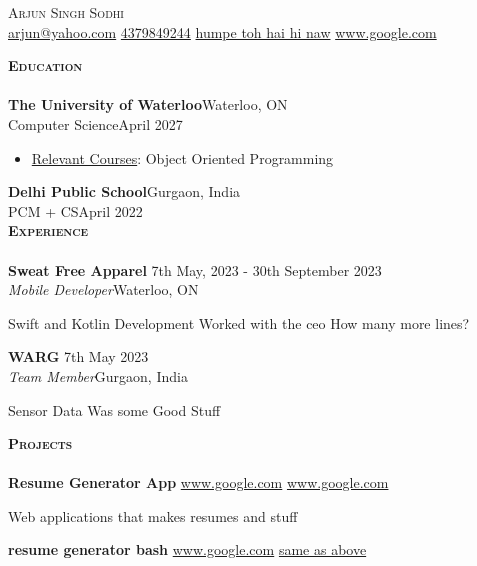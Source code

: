 \documentclass[a4paper]{article}
\newcommand{\lineunder} {
    \vspace*{-8pt} \\
    \hspace*{-18pt} \hrulefill \\
}
\newcommand{\header} [1] {
    {\hspace*{-18pt}\vspace*{6pt} \textsc{#1}}
    \vspace*{-6pt} \lineunder
}
\begin{document}
\vspace*{-40pt} 

\vspace*{-10pt}
        \begin{center}
        {\Huge \scshape Arjun Singh Sodhi} \vspace{2pt} \\
        \href{mailto:arjun@yahoo.com}{arjun@yahoo.com}
        \vline \hspace{.5pt} \href{tel:4379849244}{4379849244} 
 \vline \hspace{.5pt} \href{humpe toh hai hi naw}{humpe toh hai hi naw} 
 \vline \hspace{.5pt} \href{www.google.com}{www.google.com} 
\end{center} 
\header{\textbf{Education}} 
\textbf{The University of Waterloo}\hfill Waterloo, ON\\ 
Computer Science\hfill April 2027\\ 
\begin{itemize} \itemsep 0pt 
 \item{\underline{Relevant Courses}: Object Oriented Programming} 
 \end{itemize} 
\textbf{Delhi Public School}\hfill Gurgaon, India\\ 
PCM + CS\hfill April 2022\\ 
\header{\textbf{Experience}} 
\textbf{Sweat Free Apparel} \hfill 7th May, 2023 - 30th September 2023\\ 
\textit{Mobile Developer}\hfill Waterloo, ON\\ 
\begin{itemize} \itemsep 0pt 
\textbullet Swift and Kotlin Development 
\textbullet Worked with the ceo 
\textbullet How many more lines? 
\end{itemize} 
\textbf{WARG} \hfill 7th May 2023\\ 
\textit{Team Member}\hfill Gurgaon, India\\ 
\begin{itemize} \itemsep 0pt 
\textbullet Sensor Data 
\textbullet Was some Good Stuff 
\end{itemize} 
\header{\textbf{Projects}} 
\textbf{Resume Generator App} \vline \; \url{www.google.com}\; \vline \; \url{www.google.com}\\ 
\begin{itemize} \itemsep 0pt 
\textbullet Web applications that makes resumes and stuff 
\end{itemize} 
\textbf{resume generator bash} \vline \; \url{www.google.com}\; \vline \; \url{same as above}\\ 
\end{document}
